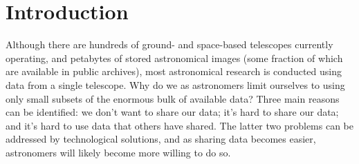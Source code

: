 \section{Introduction}



%
%
%
%
%
%
% 
%
%
%
%
%
%
%


Although there are hundreds of ground- and space-based telescopes
currently operating, and petabytes of stored astronomical images (some
fraction of which are available in public archives), most astronomical
research is conducted using data from a single telescope.  Why do we
as astronomers limit ourselves to using only small subsets of the
enormous bulk of available data?  Three main reasons can be
identified: we don't want to share our data; it's hard to share our
data; and it's hard to use data that others have shared.  The latter
two problems can be addressed by technological solutions, and as
sharing data becomes easier, astronomers will likely become more
willing to do so.


